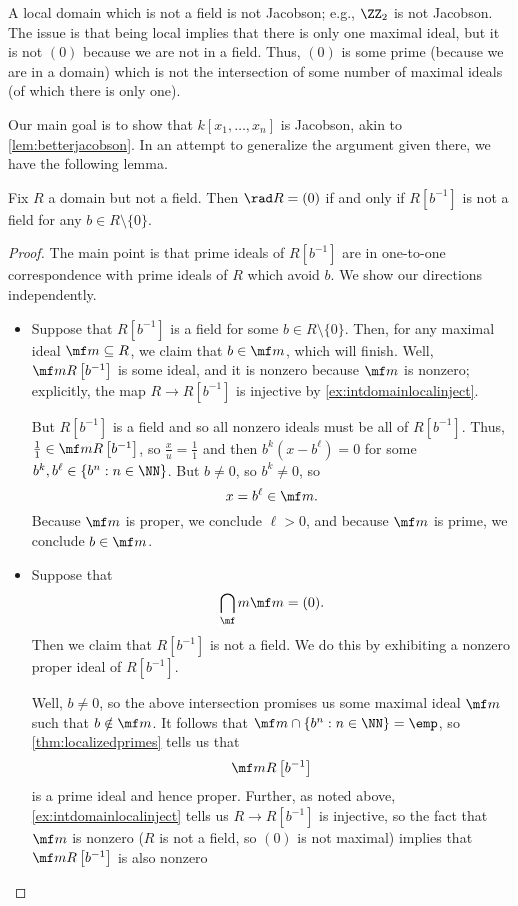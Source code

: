 \documentclass[../notes.tex]{subfiles}
\begin{document}
\begin{nex}
	A local domain which is not a field is not Jacobson; e.g., $\ZZ_2$ is not Jacobson. The issue is that being local implies that there is only one maximal ideal, but it is not $(0)$ because we are not in a field. Thus, $(0)$ is some prime (because we are in a domain) which is not the intersection of some number of maximal ideals (of which there is only one).
\end{nex}
Our main goal is to show that $k[x_1,\ldots,x_n]$ is Jacobson, akin to \autoref{lem:betterjacobson}. In an attempt to generalize the argument given there, we have the following lemma.
\begin{lemma} \label{lem:rabinowitch}
	Fix $R$ a domain but not a field. Then $\rad R=(0)$ if and only if $R\left[b^{-1}\right]$ is not a field for any $b\in R\setminus\{0\}$.
\end{lemma}
\begin{proof}
	The main point is that prime ideals of $R\left[b^{-1}\right]$ are in one-to-one correspondence with prime ideals of $R$ which avoid $b$. We show our directions independently.
	\begin{itemize}
		\item Suppose that $R\left[b^{-1}\right]$ is a field for some $b\in R\setminus\{0\}$. Then, for any maximal ideal $\mf m\subseteq R$, we claim that $b\in\mf m$, which will finish. Well, $\mf mR\left[b^{-1}\right]$ is some ideal, and it is nonzero because $\mf m$ is nonzero; explicitly, the map $R\to R\left[b^{-1}\right]$ is injective by \autoref{ex:intdomainlocalinject}.

		But $R\left[b^{-1}\right]$ is a field and so all nonzero ideals must be all of $R\left[b^{-1}\right]$. Thus, $\frac11\in\mf mR\left[b^{-1}\right]$, so $\frac xu=\frac11$ and then $b^k\left(x-b^\ell\right)=0$ for some $b^k,b^\ell\in\left\{b^n:n\in\NN\right\}$. But $b\ne0$, so $b^k\ne0$, so
		\[x=b^\ell\in\mf m.\]
		Because $\mf m$ is proper, we conclude $\ell>0$, and because $\mf m$ is prime, we conclude $b\in\mf m$.

		\item Suppose that
		\[\bigcap_\mf m\mf m=(0).\]
		Then we claim that $R\left[b^{-1}\right]$ is not a field. We do this by exhibiting a nonzero proper ideal of $R\left[b^{-1}\right]$.
		
		Well, $b\ne0$, so the above intersection promises us some maximal ideal $\mf m$ such that $b\notin\mf m$. It follows that $\mf m\cap\{b^n:n\in\NN\}=\emp$, so \autoref{thm:localizedprimes} tells us that
		\[\mf mR\left[b^{-1}\right]\]
		is a prime ideal and hence proper. Further, as noted above, \autoref{ex:intdomainlocalinject} tells us $R\to R\left[b^{-1}\right]$ is injective, so the fact that $\mf m$ is nonzero ($R$ is not a field, so $(0)$ is not maximal) implies that $\mf mR\left[b^{-1}\right]$ is also nonzero
		\qedhere
	\end{itemize}
\end{proof}
\end{document}
